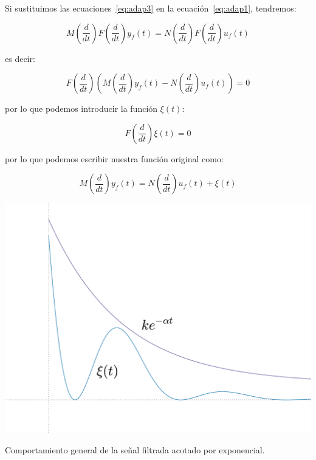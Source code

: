         Si sustituimos las ecuaciones~\ref{eq:adap3} en la ecuación~\ref{eq:adap1}, tendremos:

        \begin{equation*}
            M \left( \frac{d}{dt} \right) F \left( \frac{d}{dt} \right) y_f (t) = N \left( \frac{d}{dt} \right) F \left( \frac{d}{dt} \right) u_f (t)
        \end{equation*}

        es decir:

        \begin{equation*}
            F \left( \frac{d}{dt} \right) \left( M \left( \frac{d}{dt} \right)  y_f (t) - N \left( \frac{d}{dt} \right) u_f (t) \right) = 0
        \end{equation*}

        por lo que podemos introducir la función $\xi(t)$:

        \begin{equation*}
            F \left( \frac{d}{dt} \right) \xi(t) = 0
        \end{equation*}

        por lo que podemos escribir nuestra función original como:

        \begin{equation} \label{eq:adap4}
            M \left( \frac{d}{dt} \right) y_f(t) = N \left( \frac{d}{dt} \right) u_f(t) + \xi(t)
        \end{equation}

        \begin{marginfigure}
            \centering
            \includegraphics[width=\textwidth]{./imagenes/trayectoriafiltrada.pdf}
            \caption{\label{fig:trayectoriafiltrada}Comportamiento general de la señal filtrada acotado por exponencial.}
        \end{marginfigure}

